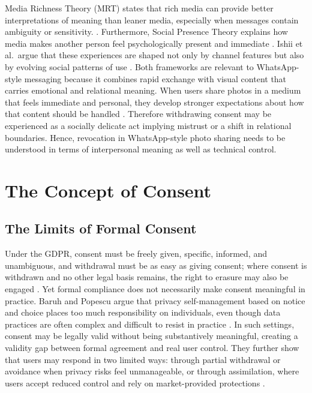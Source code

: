 Media Richness Theory (MRT) states that rich media can provide better interpretations of meaning than leaner media, especially when messages contain ambiguity or sensitivity. \cite{daft_lengel_mrt_1986}. Furthermore, Social Presence Theory explains how media makes another person feel psychologically present and immediate \cite{short_williams_christie_1976}. Ishii et al.\ argue that these experiences are shaped not only by channel features but also by evolving social patterns of use \cite{ishii_etal_2019}. Both frameworks are relevant to WhatsApp-style messaging because it combines rapid exchange with visual content that carries emotional and relational meaning. When users share photos in a medium that feels immediate and personal, they develop stronger expectations about how that content should be handled \cite{daft_lengel_mrt_1986,short_williams_christie_1976}. Therefore withdrawing consent may be experienced as a socially delicate act implying mistrust or a shift in relational boundaries. Hence, revocation in WhatsApp-style photo sharing needs to be understood in terms of interpersonal meaning as well as technical control.

\section{The Concept of Consent}

\subsection{The Limits of Formal Consent}
Under the GDPR, consent must be freely given, specific, informed, and unambiguous, and withdrawal must be as easy as giving consent; where consent is withdrawn and no other legal basis remains, the right to erasure may also be engaged \cite{gdpr_2016,politou_2018}. Yet formal compliance does not necessarily make consent meaningful in practice. Baruh and Popescu argue that privacy self-management based on notice and choice places too much responsibility on individuals, even though data practices are often complex and difficult to resist in practice \cite{baruh_big_2017}. In such settings, consent may be legally valid without being substantively meaningful, creating a validity gap between formal agreement and real user control. They further show that users may respond in two limited ways: through partial withdrawal or avoidance when privacy risks feel unmanageable, or through assimilation, where users accept reduced control and rely on market-provided protections \cite{baruh_big_2017}.

